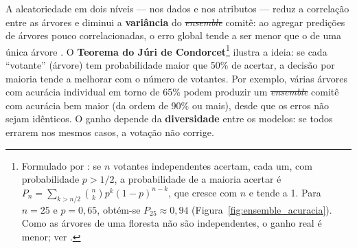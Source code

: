 \documentclass[msc]{on} %
\makeatletter
\providecommand{\DIFaddtex}[1]{{\protect\color{red}#1}} %
\providecommand{\DIFdeltex}[1]{{\protect\color{red}\sout{#1}}} %
\providecommand{\DIFaddbegin}{} %
\providecommand{\DIFaddend}{} %
\providecommand{\DIFdelbegin}{} %
\providecommand{\DIFdelend}{} %
\providecommand{\DIFadd}[1]{\texorpdfstring{\DIFaddtex{#1}}{#1}} %
\providecommand{\DIFdel}[1]{\texorpdfstring{\DIFdeltex{#1}}{}} %
\let\sout@orig\sout %
\renewcommand{\sout}[1]{\ifmmode\text{\sout@orig{\ensuremath{#1}}}\else\sout@orig{#1}\fi} %
\makeatother
\begin{document}
A aleatoriedade em dois níveis --- nos dados e nos atributos --- reduz a correlação entre as árvores e diminui a \textbf{variância} do \DIFdelbegin \textit{\DIFdel{ensemble}}%
\DIFdelend\ifhmode\hskip0pt\fi \DIFaddbegin \DIFadd{comitê}\DIFaddend : ao agregar predições de árvores pouco correlacionadas, o erro global tende a ser menor que o de uma única árvore \citep{geron2019maos}. O \textbf{Teorema do Júri de Condorcet}\footnote{Formulado por \citet{Condorcet1785}: se $n$ votantes independentes acertam, cada um, com probabilidade $p > 1/2$, a probabilidade de a maioria acertar é $P_n = \sum_{k > n/2} \binom{n}{k} p^k (1-p)^{n-k}$, que cresce com $n$ e tende a 1. Para $n = 25$ e $p = 0{,}65$, obtém-se $P_{25} \approx 0{,}94$ (Figura~\ref{fig:ensemble_acuracia}). Como as árvores de uma floresta não são independentes, o ganho real é menor; ver \citet{geron2019maos}.} ilustra a ideia: se cada ``votante'' (árvore) tem probabilidade maior que 50\% de acertar, a decisão por maioria tende a melhorar com o número de votantes. Por exemplo, várias árvores com acurácia individual em torno de 65\% podem produzir um \DIFdelbegin \textit{\DIFdel{ensemble}} %
\DIFdelend\ifhmode\hskip0pt\fi \DIFaddbegin \DIFadd{comitê }\DIFaddend com acurácia bem maior (da ordem de 90\% ou mais), desde que os erros não sejam idênticos. O ganho depende da \textbf{diversidade} entre os modelos: se todos errarem nos mesmos casos, a votação não corrige.
\end{document}
